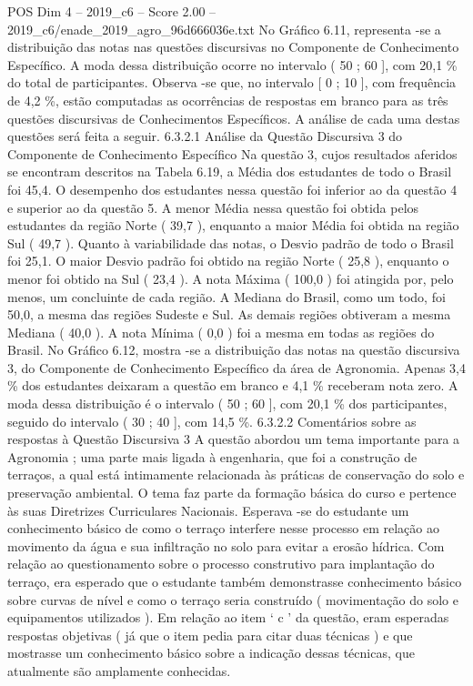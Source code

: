 \begin{textsample}{POS Dim 4 – 2019\_c6 – Score 2.00 – 2019\_c6/enade\_2019\_agro\_96d666036e.txt}
No Gráfico 6.11, representa -se a distribuição das notas nas questões discursivas no Componente de Conhecimento Específico.
A moda dessa distribuição ocorre no intervalo ( 50 ; 60 ], com 20,1 \% do total de participantes.
Observa -se que, no intervalo [ 0 ; 10 ], com frequência de 4,2 \%, estão computadas as ocorrências de respostas em branco para as três questões discursivas de Conhecimentos Específicos.
A análise de cada uma destas questões será feita a seguir. 6.3.2.1 Análise da Questão Discursiva 3 do Componente de Conhecimento Específico Na questão 3, cujos resultados aferidos se encontram descritos na Tabela 6.19, a Média dos estudantes de todo o Brasil foi 45,4.
O desempenho dos estudantes nessa questão foi inferior ao da questão 4 e superior ao da questão 5.
A menor Média nessa questão foi obtida pelos estudantes da região Norte ( 39,7 ), enquanto a maior Média foi obtida na região Sul ( 49,7 ).
Quanto à variabilidade das notas, o Desvio padrão de todo o Brasil foi 25,1.
O maior Desvio padrão foi obtido na região Norte ( 25,8 ), enquanto o menor foi obtido na Sul ( 23,4 ).
A nota Máxima ( 100,0 ) foi atingida por, pelo menos, um concluinte de cada região.
A Mediana do Brasil, como um todo, foi 50,0, a mesma das regiões Sudeste e Sul.
As demais regiões obtiveram a mesma Mediana ( 40,0 ).
A nota Mínima ( 0,0 ) foi a mesma em todas as regiões do Brasil.
No Gráfico 6.12, mostra -se a distribuição das notas na questão discursiva 3, do Componente de Conhecimento Específico da área de Agronomia.
Apenas 3,4 \% dos estudantes deixaram a questão em branco e 4,1 \% receberam nota zero.
A moda dessa distribuição é o intervalo ( 50 ; 60 ], com 20,1 \% dos participantes, seguido do intervalo ( 30 ; 40 ], com 14,5 \%. 6.3.2.2 Comentários sobre as respostas à Questão Discursiva 3 A questão abordou um tema importante para a Agronomia ; uma parte mais ligada à engenharia, que foi a construção de terraços, a qual está intimamente relacionada às práticas de conservação do solo e preservação ambiental.
O tema faz parte da formação básica do curso e pertence às suas Diretrizes Curriculares Nacionais.
Esperava -se do estudante um conhecimento básico de como o terraço interfere nesse processo em relação ao movimento da água e sua infiltração no solo para evitar a erosão hídrica.
Com relação ao questionamento sobre o processo construtivo para implantação do terraço, era esperado que o estudante também demonstrasse conhecimento básico sobre curvas de nível e como o terraço seria construído ( movimentação do solo e equipamentos utilizados ).
Em relação ao item ‘ c ’ da questão, eram esperadas respostas objetivas ( já que o item pedia para citar duas técnicas ) e que mostrasse um conhecimento básico sobre a indicação dessas técnicas, que atualmente são amplamente conhecidas.

\end{textsample}
